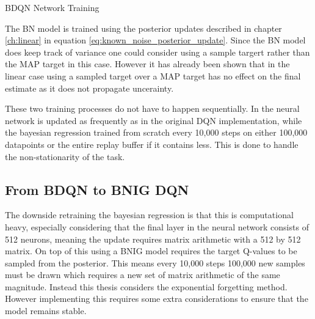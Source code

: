 \begin{algorithm}[H] 
    \caption{BDQN Network Training} 
    \label{alg:BDQN_train} 
\end{algorithm}

The BN model is trained using the posterior updates described in chapter \ref{ch:linear} in equation \ref{eq:known_noise_posterior_update}. Since the BN model does keep track of variance one could consider using a sample targert rather than the MAP target in this case. However it has already been shown that in the linear case using a sampled target over a MAP target has no effect on the final estimate as it does not propagate uncerainty.

These two training processes do not have to happen sequentially. In \cite{azziz_2018} the neural network is updated as frequently as in the original DQN implementation, while the bayesian regression trained from scratch every 10,000 steps on either 100,000 datapoints or the entire replay buffer if it contains less. This is done to handle the non-stationarity of the task. 

\subsection{From BDQN to BNIG DQN}

The downside retraining the bayesian regression is that this is computational heavy, especially considering that the final layer in the neural network consists of 512 neurons, meaning the update requires matrix arithmetic with a 512 by 512 matrix. On top of this using a BNIG model requires the target Q-values to be sampled from the posterior. This means every 10,000 steps 100,000 new samples must be drawn which requires a new set of matrix arithmetic of the same magnitude. Instead this thesis considers the exponential forgetting method. However implementing this requires some extra considerations to ensure that the model remains stable.

